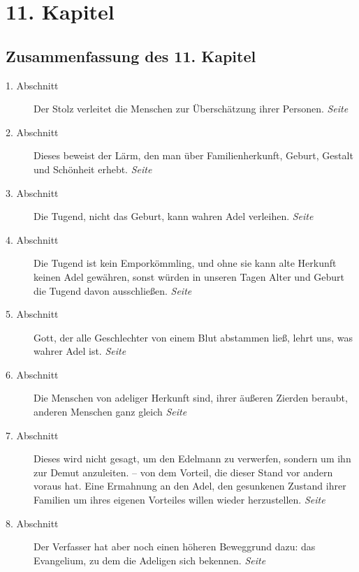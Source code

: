 
\chapter{11. Kapitel} \label{kap11}
\section{Zusammenfassung des 11. Kapitel}

\begin{description}
\item[1. Abschnitt] Der Stolz verleitet die Menschen zur Überschätzung ihrer
Personen.
\dotfill \textit{Seite \pageref{kap11_ab1}}\\
\item[2. Abschnitt] Dieses beweist der Lärm, den man über Familienherkunft,
Geburt, Gestalt und Schönheit erhebt.
\dotfill \textit{Seite \pageref{kap11_ab2}}\\
\item[3. Abschnitt] Die Tugend, nicht das Geburt, kann wahren Adel verleihen.
\dotfill \textit{Seite \pageref{kap11_ab3}}\\
\item[4. Abschnitt] Die Tugend ist kein Emporkömmling, und ohne sie kann alte
Herkunft keinen Adel gewähren, sonst würden in unseren Tagen Alter und Geburt die
Tugend davon ausschließen.
\dotfill \textit{Seite \pageref{kap11_ab4}}\\
\item[5. Abschnitt] Gott, der alle Geschlechter von einem Blut abstammen ließ,
lehrt uns, was wahrer Adel ist.
\dotfill \textit{Seite \pageref{kap11_ab5}}\\
\item[6. Abschnitt] Die Menschen von adeliger Herkunft sind, ihrer äußeren Zierden
beraubt, anderen Menschen ganz gleich
\dotfill \textit{Seite \pageref{kap11_ab6}}\\
\item[7. Abschnitt] Dieses wird nicht gesagt, um den Edelmann zu verwerfen,
sondern um ihn zur Demut anzuleiten. -- von dem Vorteil, die dieser Stand vor
andern voraus hat. Eine Ermahnung an den Adel, den gesunkenen Zustand ihrer
Familien um ihres eigenen Vorteiles willen wieder herzustellen.
\dotfill \textit{Seite \pageref{kap11_ab7}}\\
\item[8. Abschnitt] Der Verfasser hat aber noch einen höheren Beweggrund dazu:
das Evangelium, zu dem die Adeligen sich bekennen.
\dotfill \textit{Seite \pageref{kap11_ab8}}\\

\end{description}

